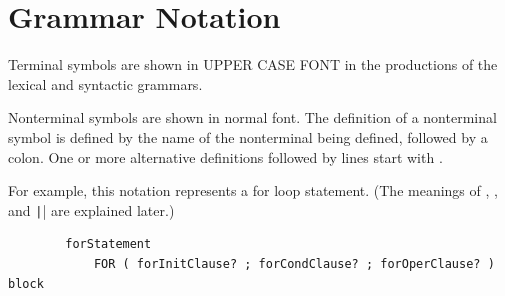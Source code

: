 \section{Grammar Notation}
\label{sec:grammar-notation}

Terminal symbols are shown in UPPER CASE FONT in the productions of the lexical and syntactic grammars.

Nonterminal symbols are shown in normal font.
The definition of a nonterminal symbol is defined by the name of the nonterminal being defined, followed by a colon.
One or more alternative definitions followed by lines start with \codeinline{|}.

For example, this notation represents a for loop statement.
(The meanings of , \codeinline{[]}, and \texttt|{}| are explained later.)


\begin{verbatim}
        forStatement
            FOR ( forInitClause? ; forCondClause? ; forOperClause? ) block
\end{verbatim}

